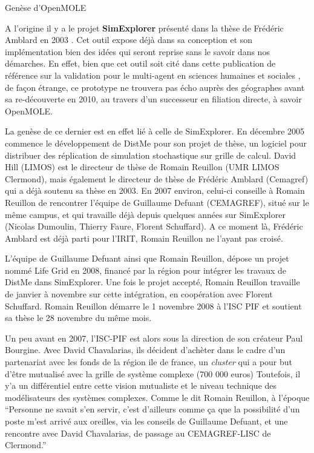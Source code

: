 \begin{framewithtitle}[geneseopenmole]{Genèse d'OpenMOLE}

A l'origine il y a le projet \textbf{SimExplorer} présenté dans la thèse de  Frédéric Amblard en 2003 \autocite{Amblard2003}. Cet outil expose déjà dans sa conception et son implémentation bien des idées qui seront reprise sans le savoir dans nos démarches. En effet, bien que cet outil soit cité dans cette publication de référence sur la validation pour le multi-agent en sciences humaines et sociales \autocite{Amblard2006}, de façon étrange, ce prototype ne trouvera pas écho auprès des géographes avant sa re-découverte en 2010, au travers d'un successeur en filiation directe, à savoir OpenMOLE. 

La genèse de ce dernier est en effet lié à celle de SimExplorer. En décembre 2005 \textcite{Reuillon2008} commence le développement de DistMe pour son projet de thèse, un logiciel pour distribuer des réplication de simulation stochastique sur grille de calcul. David Hill (LIMOS) est le directeur de thèse de Romain Reuillon (UMR LIMOS Clermond), mais également le directeur de thèse de Frédéric Amblard (Cemagref) qui a déjà soutenu sa thèse en 2003. En 2007 environ, celui-ci conseille à Romain Reuillon de rencontrer l'équipe de Guillaume Defuant (CEMAGREF), situé sur le même campus, et qui travaille déjà depuis quelques années sur SimExplorer (Nicolas Dumoulin, Thierry Faure, Florent Schuffard). A ce moment là, Frédéric Amblard est déjà parti pour l'IRIT, Romain Reuillon ne l'ayant pas croisé.

L'équipe de Guillaume Defuant ainsi que Romain Reuillon, dépose un projet nommé Life Grid en 2008, financé par la région pour intégrer les travaux de DistMe dans SimExplorer. Une fois le projet accepté, Romain Reuillon travaille de janvier à novembre sur cette intégration, en coopération avec Florent Schuffard. Romain Reuillon démarre le 1 novembre 2008 à l'ISC PIF et soutient sa thèse le 28 novembre du même mois.

Un peu avant en 2007, l'ISC-PIF est alors sous la direction de son créateur Paul Bourgine. Avec David Chavalarias, ils décident d'achèter dans le cadre d'un partenariat avec les fonds de la région ile de france, un \textit{cluster} qui a pour but d'être mutualisé avec la grille de système complexe (700 000 euros) Toutefois, il y'a un différentiel entre cette vision mutualiste et le niveau technique des modélisateurs des systèmes complexes. Comme le dit Romain Reuillon, à l'époque \enquote{Personne ne savait s'en servir, c'est d'ailleurs comme ça que la possibilité d'un poste m'est arrivé aux oreilles, via les conseils de Guillaume Defuant, et une rencontre avec David Chavalarias, de passage au CEMAGREF-LISC de Clermond.} 


\end{framewithtitle}

